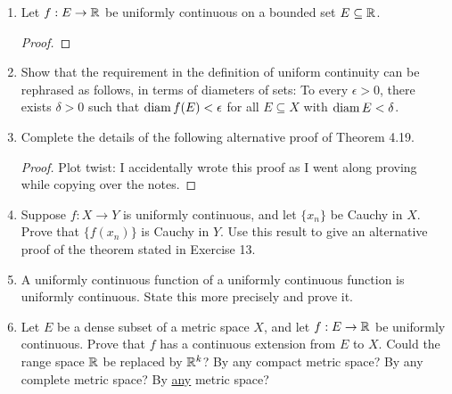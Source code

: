 \begin{enumerate}
\begin{proof}
    Notice that $\frac{ab}{a^2 + b^2} \le \frac{1}{2}$ since $(a - b)^2 = a^2 - 2ab + b^2 \ge 0$ for any $a, b$. Thus $f$ is bounded. Now, we have $g(1/n^3, 1/n) = n/2$ so $g$ is unbounded in any neighbourhood of $(0, 0)$. Finally, $f(1/n^2, 1/n) = 1/2$ for any $n$, so $f$ is discontinuous at $(0, 0)$. 

    However, if $x = cy$, $f(cy, y) = \frac{cy^3}{c^2y^2 + y^4} = \frac{cy}{c^2 + y^2} \to 0$ as $y \to 0$, so $f$ is continuous on the line $x = cy$. On any other line not passing through $(0, 0)$, the restriction is purely within the domain of the continuous definition. Similarly, $g(cy, y) = \frac{cy}{c^2 + y^4} \to 0$ as $y \to 0$, so $g$ is continuous on any straight line.
\end{proof}

\item %
Let $f: E \rightarrow \mathbb{R}$ be uniformly continuous on a bounded set $E \subseteq \mathbb{R}$. 
\begin{proof}


\end{proof}

\item %
Show that the requirement in the definition of uniform continuity can be rephrased as follows, in terms of diameters of sets: To every $\epsilon > 0$, there exists $\delta > 0$ such that $\operatorname{diam} f(E) < \epsilon$ for all $E \subseteq X$ with $\operatorname{diam} E < \delta$.

\item %
Complete the details of the following alternative proof of Theorem 4.19.
\begin{proof}
Plot twist: I accidentally wrote this proof as I went along proving while copying over the notes.
\end{proof}

\item %
Suppose $f: X \to Y$ is uniformly continuous, and let $\{x_n\}$ be Cauchy in $X$. Prove that $\{f(x_n)\}$ is Cauchy in $Y$. Use this result to give an alternative proof of the theorem stated in Exercise 13.

\item %
A uniformly continuous function of a uniformly continuous function is uniformly continuous. State this more precisely and prove it.

\item %
Let $E$ be a dense subset of a metric space $X$, and let $f: E \rightarrow \mathbb{R}$ be uniformly continuous. Prove that $f$ has a continuous extension from $E$ to $X$. Could the range space $\mathbb{R}$ be replaced by $\mathbb{R}^k$? By any compact metric space? By any complete metric space? By \underline{any} metric space?


\end{enumerate}
